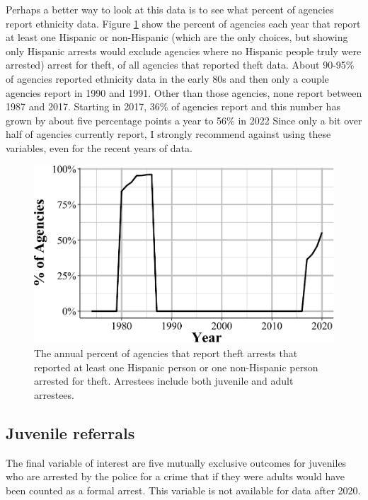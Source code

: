 \documentclass[
  12pt,
  openany]{book}
\begin{document}
Perhaps a better way to look at this data is to see what percent of agencies report ethnicity data. Figure \ref{fig:theftHispanicPercentAgencies} show the percent of agencies each year that report at least one Hispanic or non-Hispanic (which are the only choices, but showing only Hispanic arrests would exclude agencies where no Hispanic people truly were arrested) arrest for theft, of all agencies that reported theft data. About 90-95\% of agencies reported ethnicity data in the early 80s and then only a couple agencies report in 1990 and 1991. Other than those agencies, none report between 1987 and 2017. Starting in 2017, 36\% of agencies report and this number has grown by about five percentage points a year to 56\% in 2022 Since only a bit over half of agencies currently report, I strongly recommend against using these variables, even for the recent years of data.

\begin{figure}

{\centering \includegraphics[width=0.9\linewidth]{05_arrests_files/figure-latex/theftHispanicPercentAgencies-1} 

}

\caption{The annual percent of agencies that report theft arrests that reported at least one Hispanic person or one non-Hispanic person arrested for theft. Arrestees include both juvenile and adult arrestees.}\label{fig:theftHispanicPercentAgencies}
\end{figure}

\subsection{Juvenile referrals}\label{juvenile-referrals}

The final variable of interest are five mutually exclusive outcomes for juveniles who are arrested by the police for a crime that if they were adults would have been counted as a formal arrest. This variable is not available for data after 2020.
\end{document}
